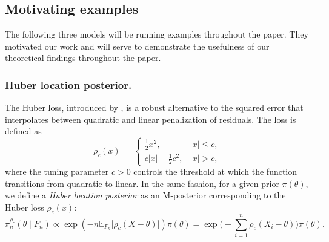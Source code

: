 \documentclass[11pt, oneside]{amsart}
\theoremstyle{definition}   %
\newcommand{\E}{\mathbb{E}}
\newcommand{\loss}{\rho}
\begin{document}
\subsection{Motivating examples }

The following three models will be running examples throughout the paper. They motivated our work and will serve to demonstrate the usefulness of our theoretical findings throughout the paper.


\subsubsection{Huber location posterior.}
\label{subsection::huber-location-posterior}
%
The Huber loss, introduced by \cite{huber1964}, is a robust alternative to the squared error that interpolates between quadratic and linear penalization of residuals. 
%
The loss is defined as 
%
\[
    \loss_c(x) =\
    \begin{cases}
        \tfrac{1}{2}x^2, & |x|\leq c, \\[6pt]
        c |x| - \tfrac{1}{2}c^2, & |x| > c,
    \end{cases}
\]
%
where the tuning parameter \( c > 0\) controls the threshold at which the function transitions from quadratic to linear. 
%
In the same fashion, for a given prior \( \pi(\theta) \), we define a \emph{Huber location posterior} as an M-posterior corresponding to the Huber loss \(\loss_c(x)\):
%
\begin{equation} \label{eqn::huber-location-posterior}
    \pi_n^{\loss_c}(\theta \mid F_n) \propto
    \exp \left (- n \E_{F_n} \bigl [ \loss_c (X - \theta) \bigr ] \right ) \pi(\theta) =
    \exp \Big ( - \sum_{i=1}^n \loss_c ( X_i - \theta )  \Big ) \pi(\theta) .
\end{equation}
\end{document}
